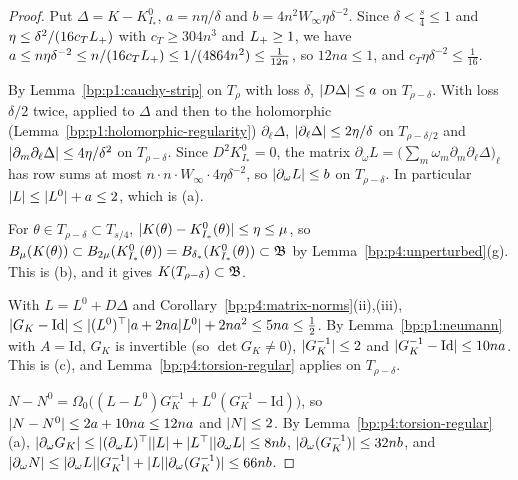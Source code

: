\begin{proof}
\label{step:p4:stab-small}
Put $\Delta=K-K^0_{I_*}$, $a=n\eta/\delta$ and $b=4n^2W_\infty\eta\delta^{-2}$. Since $\delta<\frac s4\le1$
and $\eta\le\delta^2/(16c_TL_{+})$ with $c_T\ge304n^3$ and $L_{+}\ge1$, we have
$a\le n\eta\delta^{-2}\le n/(16c_TL_{+})\le1/(4864n^2)\le\frac1{12n}$, so $12na\le1$, and
$c_T\eta\delta^{-2}\le\frac1{16}$.

\label{step:p4:stab-cauchy}
By Lemma~\ref{bp:p1:cauchy-strip} on $T_\rho$ with loss $\delta$, $\lvert D\Delta\rvert\le a$ on
$T_{\rho-\delta}$. With loss $\delta/2$ twice, applied to $\Delta$ and then to the holomorphic
(Lemma~\ref{bp:p1:holomorphic-regularity}) $\partial_\ell\Delta$, $\lvert \partial_\ell\Delta\rvert\le2\eta/\delta$ on
$T_{\rho-\delta/2}$ and $\lvert \partial_m\partial_\ell\Delta\rvert\le4\eta/\delta^2$ on $T_{\rho-\delta}$. Since
$D^2K^0_{I_*}=0$, the matrix $\partial_\omega L=\bigl(\sum_m\omega_m\partial_m\partial_\ell\Delta\bigr)_\ell$
has row sums at most $n\cdot n\cdot W_\infty\cdot4\eta\delta^{-2}$, so $\lvert \partial_\omega L\rvert\le b$ on
$T_{\rho-\delta}$. In particular $\lvert L\rvert\le\lvert L^0\rvert+a\le2$, which is (a).

\label{step:p4:stab-ball}
For $\theta\in T_{\rho-\delta}\subset T_{s/4}$, $\lvert K(\theta)-K^0_{I_*}(\theta)\rvert\le\eta\le\mu$, so
$B_\mu(K(\theta))\subset B_{2\mu}(K^0_{I_*}(\theta))=B_{\delta_*}(K^0_{I_*}(\theta))\subset\mathfrak{B}$ by
Lemma~\ref{bp:p4:unperturbed}(g). This is (b), and it gives $K(T_{\rho-\delta})\subset\mathfrak{B}$.

\label{step:p4:stab-gram}
With $L=L^0+D\Delta$ and Corollary~\ref{bp:p4:matrix-norms}(ii),(iii),
$\lvert G_K-\mathrm{Id}\rvert\le\lvert (L^0)^\top\rvert a+2na\lvert L^0\rvert+2na^2\le5na\le\frac12$. By
Lemma~\ref{bp:p1:neumann} with $A=\mathrm{Id}$, $G_K$ is invertible (so $\det G_K\ne0$),
$\lvert G_K^{-1}\rvert\le2$ and $\lvert G_K^{-1}-\mathrm{Id}\rvert\le10na$. This is (c), and
Lemma~\ref{bp:p4:torsion-regular} applies on $T_{\rho-\delta}$.

\label{step:p4:stab-frame}
$N-N^0=\Omega_0\bigl((L-L^0)G_K^{-1}+L^0(G_K^{-1}-\mathrm{Id})\bigr)$, so
$\lvert N-N^0\rvert\le2a+10na\le12na$ and $\lvert N\rvert\le2$. By Lemma~\ref{bp:p4:torsion-regular}(a),
$\lvert \partial_\omega G_K\rvert\le\lvert (\partial_\omega L)^\top\rvert\lvert L\rvert+\lvert L^\top\rvert\lvert \partial_\omega L\rvert\le8nb$,
$\lvert \partial_\omega(G_K^{-1})\rvert\le32nb$, and
$\lvert \partial_\omega N\rvert\le\lvert \partial_\omega L\rvert\lvert G_K^{-1}\rvert+\lvert L\rvert\lvert \partial_\omega(G_K^{-1})\rvert\le66nb$.


\end{proof}
